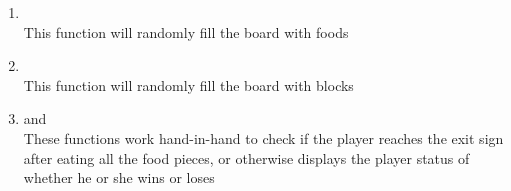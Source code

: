 \begin{enumerate}
    \item {}\\
    \hspace{1em} This function will randomly fill the board with foods
    \item {}\\
    \hspace{1em} This function will randomly fill the board with blocks
    \item {} and \\
    \hspace{1em} These functions work hand-in-hand to check if the player reaches the exit sign after eating all the food pieces,
    or otherwise displays the player status of whether he or she wins or loses
\end{enumerate}